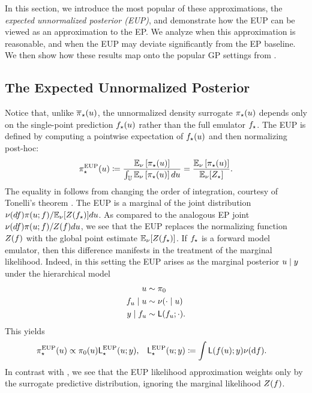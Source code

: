 \documentclass[12pt]{article}
\begin{document}
In this section, we introduce the most popular of these approximations, the 
\textit{expected unnormalized posterior (EUP)}, and demonstrate 
how the EUP can be viewed as an approximation to the EP.
We analyze when this approximation is reasonable, and when the EUP may 
deviate significantly from the EP baseline. We then show how these results map 
onto the popular GP settings from .

\subsection{The Expected Unnormalized Posterior} \label{sec:eup}
Notice that, unlike ${\overline{\pi}}_{\star}(u)$, the unnormalized density surrogate
${\pi}_{\star}(u)$ depends only on the single-point prediction ${f}_{\star}(u)$
rather than the full emulator ${f}_{\star}$. The EUP is defined by computing
a pointwise expectation of ${f}_{\star}(u)$ and then normalizing post-hoc:
\begin{equation}
{\pi}_{\star}^{\mathrm{EUP}}(u) \coloneqq 
\frac{\mathbb{E}_{\nu} \left[{\pi}_{\star}(u) \right]}{\int_{\mathbb{U}} \mathbb{E}_{\nu}\left[{\pi}_{\star}(u) \right] du}
= \frac{\mathbb{E}_{\nu}\left[{\pi}_{\star}(u) \right]}{\mathbb{E}_{\nu}[{Z}_{\star}]}. \label{eq:post-approx-EL} 
\end{equation}
The equality in  follows from
changing the order of integration, courtesy of Tonelli's theorem \citep{StuartTeck1}. The EUP
is a marginal of the joint distribution 
$\nu(df) \pi(u; f) / \mathbb{E}_{\nu}[Z({f}_{\star})] du$. 
As compared to the analogous EP joint
$\nu(df) \pi(u; f) / Z(f) du$,
we see that the EUP replaces the normalizing function $Z(f)$ with
the global point estimate $\mathbb{E}_{\nu}[Z({f}_{\star})]$. If ${f}_{\star}$ is a forward 
model emulator, then this difference manifests in the treatment of the marginal likelihood.
Indeed, in this setting the EUP arises as the marginal posterior 
$u \mid y$ under the hierarchical model
\begin{align}
u &\sim \pi_0 \label{eq:el-prob-model} \\
f_u \mid u &\sim \nu(\cdot \mid u) \nonumber \\
y \mid f_u &\sim \mathsf{L}(f_u; \cdot). \nonumber
\end{align}
This yields 
\begin{align*}
&\postApproxEUP(\Par) \propto \priorDens(\Par) \likApproxEUP(\Par; \obs),
&&\likApproxEUP(\Par; \obs) \Def \int \lik(\targetTraj(\Par); \obs) \emDist(\d\targetTraj). 
\end{align*}
In contrast with , we see that the EUP likelihood approximation 
weights only by the surrogate predictive distribution, ignoring the marginal 
likelihood $Z(f)$.
\end{document}
